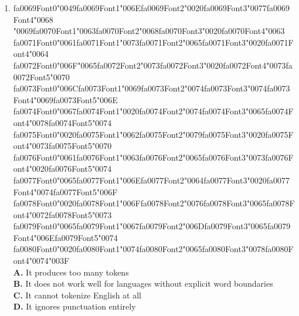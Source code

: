 \documentclass[11pt]{article}
\begin{document}
\begin{enumerate}[label=Q\arabic*., leftmargin=*]
\item {\csname fa0069Font0\endcsname\char"0049}{\csname fa0069Font1\endcsname\char"006E}{\csname fa0069Font2\endcsname\char"0020}{\csname fa0069Font3\endcsname\char"0077}{\csname fa0069Font4\endcsname\char"0068} {\char"0069}{\csname fa0070Font1\endcsname\char"0063}{\csname fa0070Font2\endcsname\char"0068}{\csname fa0070Font3\endcsname\char"0020}{\csname fa0070Font4\endcsname\char"0063} {\csname fa0071Font0\endcsname\char"0061}{\csname fa0071Font1\endcsname\char"0073}{\csname fa0071Font2\endcsname\char"0065}{\csname fa0071Font3\endcsname\char"0020}{\csname fa0071Font4\endcsname\char"0064} {\csname fa0072Font0\endcsname\char"006F}{\char"0065}{\csname fa0072Font2\endcsname\char"0073}{\csname fa0072Font3\endcsname\char"0020}{\csname fa0072Font4\endcsname\char"0073}{\csname fa0072Font5\endcsname\char"0070} {\csname fa0073Font0\endcsname\char"006C}{\csname fa0073Font1\endcsname\char"0069}{\csname fa0073Font2\endcsname\char"0074}{\csname fa0073Font3\endcsname\char"0074}{\csname fa0073Font4\endcsname\char"0069}{\csname fa0073Font5\endcsname\char"006E} {\csname fa0074Font0\endcsname\char"0067}{\csname fa0074Font1\endcsname\char"0020}{\csname fa0074Font2\endcsname\char"0074}{\csname fa0074Font3\endcsname\char"0065}{\csname fa0074Font4\endcsname\char"0078}{\csname fa0074Font5\endcsname\char"0074} {\csname fa0075Font0\endcsname\char"0020}{\csname fa0075Font1\endcsname\char"0062}{\csname fa0075Font2\endcsname\char"0079}{\csname fa0075Font3\endcsname\char"0020}{\csname fa0075Font4\endcsname\char"0073}{\csname fa0075Font5\endcsname\char"0070} {\csname fa0076Font0\endcsname\char"0061}{\csname fa0076Font1\endcsname\char"0063}{\csname fa0076Font2\endcsname\char"0065}{\csname fa0076Font3\endcsname\char"0073}{\csname fa0076Font4\endcsname\char"0020}{\csname fa0076Font5\endcsname\char"0074} {\csname fa0077Font0\endcsname\char"0065}{\csname fa0077Font1\endcsname\char"006E}{\csname fa0077Font2\endcsname\char"0064}{\csname fa0077Font3\endcsname\char"0020}{\csname fa0077Font4\endcsname\char"0074}{\csname fa0077Font5\endcsname\char"006F} {\csname fa0078Font0\endcsname\char"0020}{\csname fa0078Font1\endcsname\char"006F}{\csname fa0078Font2\endcsname\char"0076}{\csname fa0078Font3\endcsname\char"0065}{\csname fa0078Font4\endcsname\char"0072}{\csname fa0078Font5\endcsname\char"0073} {\csname fa0079Font0\endcsname\char"0065}{\csname fa0079Font1\endcsname\char"0067}{\csname fa0079Font2\endcsname\char"006D}{\csname fa0079Font3\endcsname\char"0065}{\csname fa0079Font4\endcsname\char"006E}{\csname fa0079Font5\endcsname\char"0074} {\csname fa0080Font0\endcsname\char"0020}{\csname fa0080Font1\endcsname\char"0074}{\csname fa0080Font2\endcsname\char"0065}{\csname fa0080Font3\endcsname\char"0078}{\csname fa0080Font4\endcsname\char"0074}{\char"003F}\\[0.25em]
\textbf{A.} It produces too many tokens\\
\textbf{B.} It does not work well for languages without explicit word boundaries\\
\textbf{C.} It cannot tokenize English at all\\
\textbf{D.} It ignores punctuation entirely


\end{enumerate}
\end{document}
